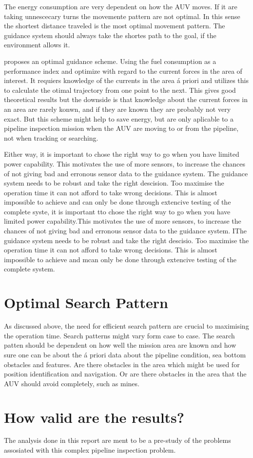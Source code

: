 	The energy consumption are very dependent on how the AUV moves. If it are taking unnescecary turns the
	movemente pattern are not optimal. In this sense the shortest distance traveled is the most optimal
	movement pattern. The guidance system should always take the shortes path to the goal, if the
	environment allows it. 
	
	\cite{fuel_optimal_control} proposes an optimal guidance scheme. Using the
	fuel consumption as a performance index and optimize with regard to the current forces in the area of
	interest. It requiers knowledge of the currents in the area \'a priori and utilizes this to calculate
	the otimal trajectory from one point to the next. This gives good theoretical results but the downside
	is that knowledge about the current forces in an area are rarely konwn, and if they are known they are
	probably not very exact. But this scheme might help to save energy, but are only aplicable to a
	pipeline inspection mission when the AUV are moving to or from the pipeline, not when tracking or
	searching.
	
	Either way, it is important to chose the right way to go when you have limited power capability. This
	motivates the use of more sensors, to increase the chances of not giving bad and erronous sensor data
	to the guidance system. The guidance system needs to be robust and take the right descision. Too
	maximise the operation time it can not afford to take wrong decisions. This is almost impossible to
	achieve and can only be done through extencive testing of the complete syste, it is important tto
	chose the right way to go when you have limited power capability.This motivates the use of more
	sensors, to increase the chances of not giving bad and erronous sensor data to the guidance system.
	IThe guidance system needs to be robust and take the right descisio. Too maximise the operation time
	it can not afford to take wrong decisions. This is almost impossible to achieve and mcan only be done
	through extencive testing of the complete system.

\section{Optimal Search Pattern}
	As discussed above, the need for efficient search pattern are crucial to maximising the operation
	time. Search patterns might vary form case to case. The search patten should be dependent on how well
	the mission area are known and how sure one can be about the \'a priori data about the pipeline
	condition, sea bottom obstacles and features. Are there obstacles in the area which might be used for
	position identification and navigation. Or are there obstacles in the area that the AUV should avoid
	completely, such as mines. 

\section{How valid are the results?}
	The analysis done in this report are ment to be a pre-study of the problems assosiated with this
	complex pipeline inspection problem.

